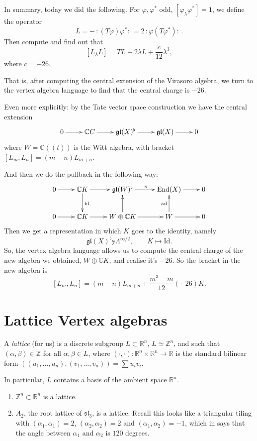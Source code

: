 \medskip\noindent
In summary, today we did the following.
For $\varphi, \varphi^*$ odd, $[\varphi_\lambda \varphi^*]=1$,
we define the operator
$$
L=-\,:\!(T\varphi)\varphi^*\!:\,=2\,:\!\varphi(T\varphi^*)\!:\,.
$$
Then compute and find out that
 $$
[L_\lambda L]=TL+2\lambda L+\frac{c}{12}\lambda^3,
$$
where $c=-26$.

That is, after computing the central extension
of the Virasoro algebra, we turn to the
vertex algebra language to find that the central
charge is $-26$.

Even more explicitly: by the Tate vector space construction
we have the central extension
$$
\xymatrix{
0\ar[r]&\mathbb{C}C\ar[r]&\mathfrak{gl}(X)^\flat\ar[r]&\mathfrak{gl}(X)\ar[r]&0
}
$$
where $W=\mathbb{C}((t))$ is the Witt algebra,
with bracket $[L_m,L_n]=(m-n)L_{m+n}$.

And then we do the pullback in the following way:
$$
\xymatrix{
0\ar[r]&\mathbb{C}K\ar[d]^{\text{id}}\ar[r]
&\mathfrak{gl}(W)^\flat\ar[r]^\pi
&\text{End}(X)\ar[r]&0\\
0\ar[r]&\mathbb{C}K\ar[r]&W \oplus \mathbb{C} K\ar[u]\ar[r]
& W\ar[u]^{\text{ad}}\ar[r]&0
}
$$
Then we get a representation in which $K$ goes to the identity,
namely
$$
\mathfrak{gl}(X)^\flat \mathbb{y} \Lambda^{\infty/2},
\qquad K \mapsto \text{Id}.
$$
So, the vertex algebra language allows us to compute
the central charge of the new algebra we obtained,
$W \oplus \mathbb{C}K$,
and realise it's $-26$. So the bracket in the new algebra is
 $$
[L_m,L_n]=(m-n)L_{m+n}+\frac{m^3-m}{12}(-26)K.
$$

\section{Lattice Vertex algebras}
\label{section-lattices}

\begin{definition}
\label{definition-lattice}
A {\it lattice} (for us) is a discrete subgroup $L \subset \mathbb{R}^n$,
$L \simeq \mathbb{Z}^n$, and such that $(\alpha,\beta) \in \mathbb{Z}$ 
for all $\alpha, \beta \in L$,
where $(\cdot,\cdot):\mathbb{R}^n \times \mathbb{R}^n \to \mathbb{R}$ 
is the standard bilinear form
$((u_1,\ldots,u_n),(v_1,\ldots,v_n))=\sum u_iv_i$.
\end{definition}

\noindent
In particular, $L$ contains a basis of the 
ambient space $\mathbb{R}^n$.

\begin{example}
\label{example-lattices}
\begin{enumerate}
\item $\mathbb{Z}^n \subset \mathbb{R}^n$ is a lattice.
\item $A_2$, the root lattice of $\mathfrak{sl}_3$, is a lattice.
Recall this looks like a triangular tiling with
$(\alpha_1,\alpha_1)=2$, $(\alpha_2,\alpha_2)=2$ 
and $(\alpha_1,\alpha_2)=-1$, which in says
that the angle between $\alpha_1$ and $\alpha_2$ is $120$ degrees. 
\end{enumerate}
\end{example}

